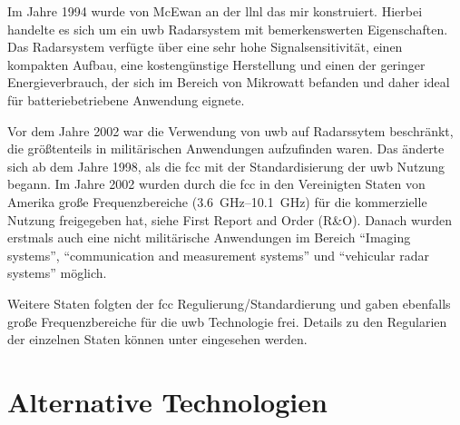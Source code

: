 

Im Jahre 1994 wurde von McEwan an der \gls{llnl} das \gls{mir} konstruiert. Hierbei handelte es sich um ein \gls{uwb} Radarsystem mit bemerkenswerten Eigenschaften. Das Radarsystem verfügte über eine sehr hohe Signalsensitivität, einen kompakten Aufbau, eine kostengünstige Herstellung und einen der geringer Energieverbrauch, der sich im Bereich von Mikrowatt befanden und daher ideal für batteriebetriebene Anwendung eignete. \cite{barrett2001technical}


Vor dem Jahre 2002 war die Verwendung von \gls{uwb} auf Radarssytem beschränkt, die größtenteils in militärischen Anwendungen aufzufinden waren. \cite{yang2004uwbcom} Das änderte sich ab dem Jahre 1998, als die \gls{fcc} mit der Standardisierung der \gls{uwb} Nutzung begann. Im Jahre 2002 wurden durch die \gls{fcc} in den Vereinigten Staten von Amerika große Frequenzbereiche (\SIrange{3.6}{10.1}{\GHz}) für die kommerzielle Nutzung freigegeben hat, siehe First Report and Order (R\&O). Danach wurden erstmals auch eine nicht militärische Anwendungen im Bereich ``Imaging systems'', ``communication and measurement systems'' und ``vehicular radar systems'' möglich. \cite{yang2004uwbcom}


Weitere Staten folgten der \gls{fcc} Regulierung/Standardierung und gaben ebenfalls große Frequenzbereiche für die \gls{uwb} Technologie frei. Details zu den Regularien der einzelnen Staten können unter \cite{decawave2015uwbreg} eingesehen werden.

	
\begin{comment}
------------------------------------------------------------------------------------------
\end{comment}
\section{Alternative Technologien}

